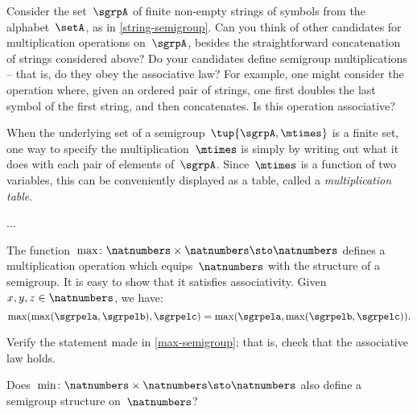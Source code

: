 \begin{exercise} 
  \label{ex:alphabet}
  Consider the set~$\sgrpA$ of finite non-empty strings of symbols from the alphabet~$\setA$, as in \cref{string-semigroup}.
Can you think of other candidates for multiplication operations on~$\sgrpA$, besides the straightforward concatenation of strings considered above?
Do your candidates define semigroup multiplications -- that is, do they obey the associative law?
For example, one might consider the operation where, given an ordered pair of strings, one first doubles the last symbol of the first string, and then concatenates. Is this operation associative?
\end{exercise}
\begin{solution}
\end{solution}

When the underlying set of a semigroup~$\tup{\sgrpA, \mtimes}$ is a finite set, one way to specify the multiplication~$\mtimes$ is simply by writing out what it does with each pair of elements of~$\sgrpA$.
Since~$\mtimes$ is a function of two variables, this can be conveniently displayed as a table, called a \emph{multiplication table}.


\begin{example}
...
\end{example}


\begin{example}
  \label{max-semigroup}
  The function~$\max \colon \natnumbers \times \natnumbers \sto \natnumbers$ defines a multiplication operation which equips~$\natnumbers$ with the structure of a semigroup.
It is easy to show that it satisfies associativity. Given~$x,y,z\in \natnumbers$, we have:
\begin{equation*}
\label{eq:max-assoc}
\max(\max(\sgrpela,\sgrpelb),\sgrpelc)=\max(\sgrpela,\max(\sgrpelb,\sgrpelc)).
\end{equation*}
\end{example}

\begin{exercise}
  \label{ex:max-semigroup}
  Verify the statement made in \cref{max-semigroup}; that is, check that the associative law holds.

  Does~$\min \colon \natnumbers \times \natnumbers \sto \natnumbers$ also define a semigroup structure on~$\natnumbers$?
\end{exercise}
\begin{solution}
\end{solution}

